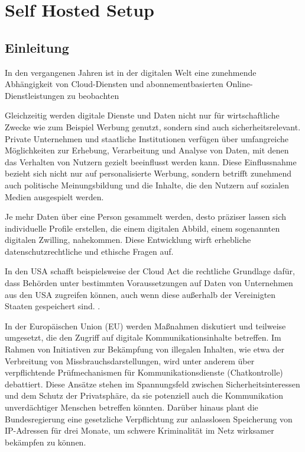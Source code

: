\chapter{Self Hosted Setup}

\section{Einleitung}

In den vergangenen Jahren ist in der digitalen Welt eine zunehmende Abhängigkeit von Cloud-Diensten und abonnementbasierten Online-Dienstleistungen zu beobachten \cite{statista_cloud_2025,eurostat_cloud_2026} 

Gleichzeitig werden digitale Dienste und Daten nicht nur für wirtschaftliche Zwecke wie zum Beispiel Werbung genutzt, sondern sind auch sicherheitsrelevant. Private Unternehmen und staatliche Institutionen verfügen über umfangreiche Möglichkeiten zur Erhebung, Verarbeitung und Analyse von Daten, mit denen das Verhalten von Nutzern gezielt beeinflusst werden kann\cite{edps_online_manipulation_2018,jrc_technology_democracy_2020}. Diese Einflussnahme bezieht sich nicht nur auf personalisierte Werbung, sondern betrifft zunehmend auch politische Meinungsbildung und die Inhalte, die den Nutzern auf sozialen Medien ausgespielt werden\cite{jrc_technology_democracy_2020}.

Je mehr Daten über eine Person gesammelt werden, desto präziser lassen sich individuelle Profile erstellen, die einem digitalen Abbild, einem sogenannten \glqq digitalen Zwilling\grqq, nahekommen.\cite{gdpr_2016} Diese Entwicklung wirft erhebliche datenschutzrechtliche und ethische Fragen auf. 

In den \ac{USA} schafft beispielsweise der Cloud Act die rechtliche Grundlage dafür, dass Behörden unter bestimmten Voraussetzungen auf Daten von Unternehmen aus den \acs{USA} zugreifen können, auch wenn diese außerhalb der Vereinigten Staaten gespeichert sind. \cite{uscode_cloud_act_2713}.


In der Europäischen Union (\acs{EU}) werden Maßnahmen diskutiert und teilweise umgesetzt, die den Zugriff auf digitale Kommunikationsinhalte betreffen. Im Rahmen von Initiativen zur Bekämpfung von illegalen Inhalten, wie etwa der Verbreitung von Missbrauchsdarstellungen, wird unter anderem über verpflichtende Prüfmechanismen für Kommunikationsdienste (\glqq Chatkontrolle\grqq) debattiert.\cite{eu_csam_proposal_2022,eu_csam_interim_2024} Diese Ansätze stehen im Spannungsfeld zwischen Sicherheitsinteressen und dem Schutz der Privatsphäre, da sie potenziell auch die Kommunikation unverdächtiger Menschen betreffen könnten. Darüber hinaus plant die Bundesregierung eine gesetzliche Verpflichtung zur anlasslosen Speicherung von IP-Adressen für drei Monate, um schwere Kriminalität im Netz wirksamer bekämpfen zu können.\cite{bundesregierung_ip_2026}

